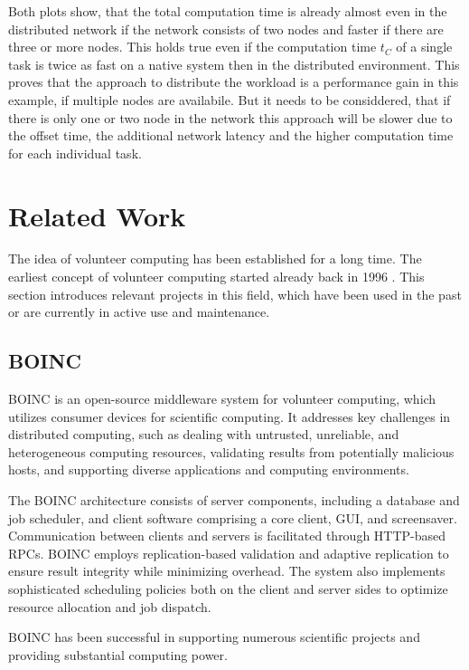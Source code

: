 Both plots show, that the total computation time is already almost even in the distributed network if the network consists of two nodes and faster if there are three or more nodes. This holds true even if the computation time $t_{C}$ of a single task is twice as fast on a native system then in the distributed environment. This proves that the approach to distribute the workload is a performance gain in this example, if multiple nodes are availabile. But it needs to be considdered, that if there is only one or two node in the network this approach will be slower due to the offset time, the additional network latency and the higher computation time for each individual task.


\section{Related Work}
\label{sec:background:related_work}
The idea of volunteer computing has been established for a long time. The earliest concept of volunteer computing started already back in 1996 \cite{relatedwork:boinc1}. This section introduces relevant projects in this field, which have been used in the past or are currently in active use and maintenance.

\subsection{BOINC}
\label{subsec:background:related_work:boinc}
\ac{BOINC} is an open-source middleware system for volunteer computing, which utilizes consumer devices for scientific computing. It addresses key challenges in distributed computing, such as dealing with untrusted, unreliable, and heterogeneous computing resources, validating results from potentially malicious hosts, and supporting diverse applications and computing environments. \cite{relatedwork:boinc1}

The BOINC architecture consists of server components, including a database and job scheduler, and client software comprising a core client, GUI, and screensaver. Communication between clients and servers is facilitated through HTTP-based RPCs. BOINC employs replication-based validation and adaptive replication to ensure result integrity while minimizing overhead. The system also implements sophisticated scheduling policies both on the client and server sides to optimize resource allocation and job dispatch. \cite{relatedwork:boinc1}

BOINC has been successful in supporting numerous scientific projects and providing substantial computing power. \cite{relatedwork:boinc1}

